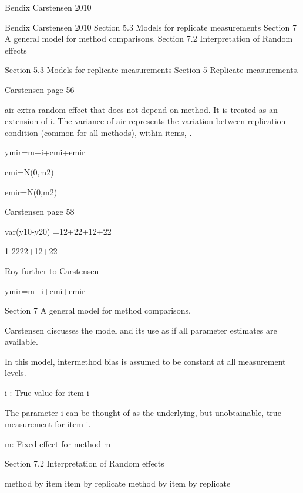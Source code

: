 
Bendix Carstensen 2010

Bendix Carstensen 2010
Section 5.3 Models for replicate measurements
Section 7 A general model for method comparisons.
Section 7.2 Interpretation of Random effects


Section 5.3 Models for replicate measurements
Section 5 Replicate measurements.

Carstensen page 56

air extra random effect that does not depend on method.
It is treated as an extension of i.
The variance of air represents the variation between replication condition (common for all methods), within items, .

ymir=m+i+cmi+emir

cmi=N(0,m2)

emir=N(0,m2)

Carstensen page 58

var(y10-y20) =12+22+12+22

1-2222+12+22

Roy further to Carstensen

ymir=m+i+cmi+emir



  



Section 7 A general model for method comparisons.

Carstensen discusses the model and its use as if all parameter estimates are available.

In this model, intermethod bias is assumed to be constant at all measurement levels.

i : True value for item i

The parameter i can be thought of as the underlying, but unobtainable, true measurement for item i.

m: Fixed effect for method m


Section 7.2 Interpretation of Random effects

method by item
item by replicate
method by item by replicate




